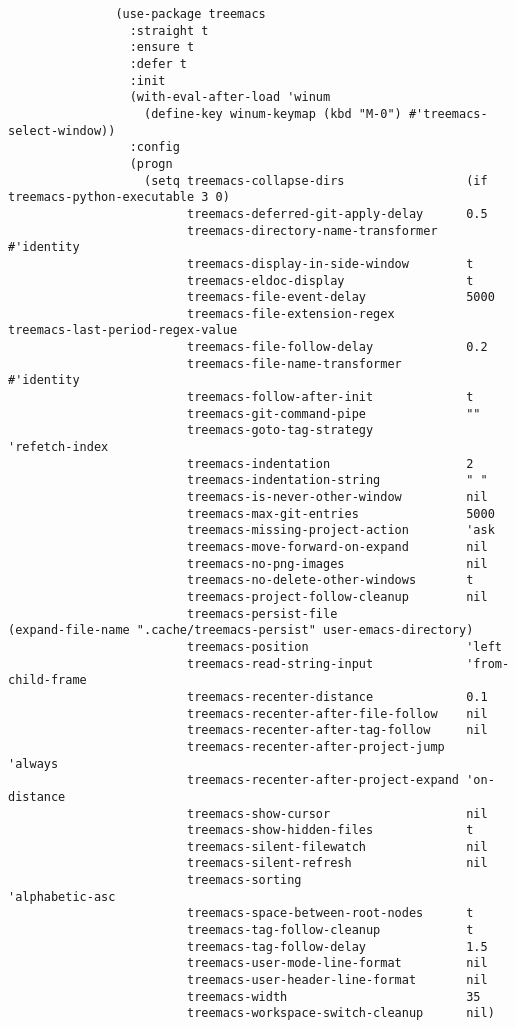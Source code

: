 \documentclass[11pt]{article}
\begin{document}
\begin{verbatim}
               (use-package treemacs
                 :straight t
                 :ensure t
                 :defer t
                 :init
                 (with-eval-after-load 'winum
                   (define-key winum-keymap (kbd "M-0") #'treemacs-select-window))
                 :config
                 (progn
                   (setq treemacs-collapse-dirs                 (if treemacs-python-executable 3 0)
                         treemacs-deferred-git-apply-delay      0.5
                         treemacs-directory-name-transformer    #'identity
                         treemacs-display-in-side-window        t
                         treemacs-eldoc-display                 t
                         treemacs-file-event-delay              5000
                         treemacs-file-extension-regex          treemacs-last-period-regex-value
                         treemacs-file-follow-delay             0.2
                         treemacs-file-name-transformer         #'identity
                         treemacs-follow-after-init             t
                         treemacs-git-command-pipe              ""
                         treemacs-goto-tag-strategy             'refetch-index
                         treemacs-indentation                   2
                         treemacs-indentation-string            " "
                         treemacs-is-never-other-window         nil
                         treemacs-max-git-entries               5000
                         treemacs-missing-project-action        'ask
                         treemacs-move-forward-on-expand        nil
                         treemacs-no-png-images                 nil
                         treemacs-no-delete-other-windows       t
                         treemacs-project-follow-cleanup        nil
                         treemacs-persist-file                  (expand-file-name ".cache/treemacs-persist" user-emacs-directory)
                         treemacs-position                      'left
                         treemacs-read-string-input             'from-child-frame
                         treemacs-recenter-distance             0.1
                         treemacs-recenter-after-file-follow    nil
                         treemacs-recenter-after-tag-follow     nil
                         treemacs-recenter-after-project-jump   'always
                         treemacs-recenter-after-project-expand 'on-distance
                         treemacs-show-cursor                   nil
                         treemacs-show-hidden-files             t
                         treemacs-silent-filewatch              nil
                         treemacs-silent-refresh                nil
                         treemacs-sorting                       'alphabetic-asc
                         treemacs-space-between-root-nodes      t
                         treemacs-tag-follow-cleanup            t
                         treemacs-tag-follow-delay              1.5
                         treemacs-user-mode-line-format         nil
                         treemacs-user-header-line-format       nil
                         treemacs-width                         35
                         treemacs-workspace-switch-cleanup      nil)


\end{verbatim}
\end{document}
